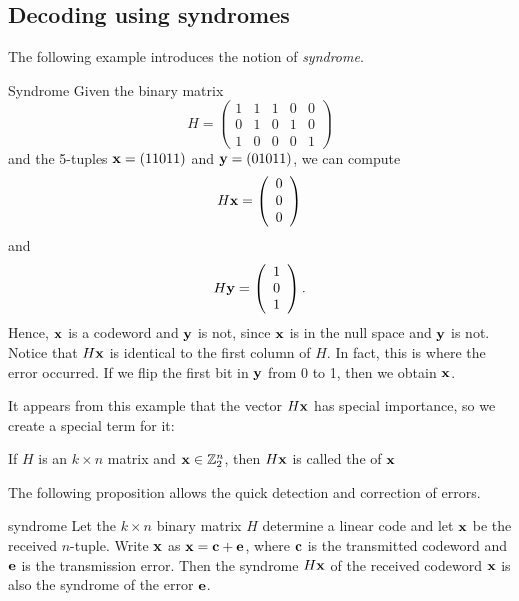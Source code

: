 \subsection{Decoding using syndromes}
\label{subsec:ErrorAndCorrectionCode:EfficientDecoding:DecodeSyndromes}

The following example introduces the notion of \emph{syndrome}.
 
\begin{example}{Syndrome}
Given the binary matrix
\[
H =
\left(
\begin{array}{ccccc}
1 & 1 & 1 & 0 & 0 \\
0 & 1 & 0 & 1 & 0 \\
1 & 0 & 0 & 0 & 1
\end{array}
\right)
\]
and the 5-tuples ${\bold x} = (11011)$ and ${\bold y} =
(01011)$, we can compute
\[
H{\bold x} =
\left(
\begin{array}{c} 0 \\ 0 \\ 0 \end{array}
\right)
\]
and
\[
H{\bold y} =
\left(
\begin{array}{c} 1 \\ 0 \\ 1 \end{array}
\right).
\]
Hence, ${\bold x}$ is a codeword and ${\bold y}$ is not, since
${\bold x}$ is in the null space and ${\bold y}$ is not. Notice that
$H{\bold x}$ is identical to the first column of $H$. In fact, this is
where the error occurred. If we flip the first bit in ${\bold y}$ from
0 to 1, then we obtain ${\bold x}$.  
\end{example}
 
 It appears from this example that the vector $H{\bold x}$ has special importance, so we create a special term for it:
 
 \begin{defn}
If $H$ is an $k \times n$ matrix and ${\bold x} \in \mathbb{Z}_2^n$,
then $H{\bold x}$ is called the  of
${\bold x}$
\end{defn}

\noindent
The following proposition allows
the quick detection and correction of errors.
 
 \begin{prop}{syndrome}
Let the $k \times n$ binary matrix $H$ determine a linear code and let
${\bold x}$ be the received $n$-tuple. Write ${\bold x}$ as ${\bold x}
=  {\bold c} +{\bold e}$, where ${\bold c}$ is the transmitted codeword
and ${\bold e}$ is the transmission error. Then the syndrome  $H{\bold
x}$ of the received codeword ${\bold x}$ is also the syndrome
of the error ${\bold e}$.
\end{prop}
 
